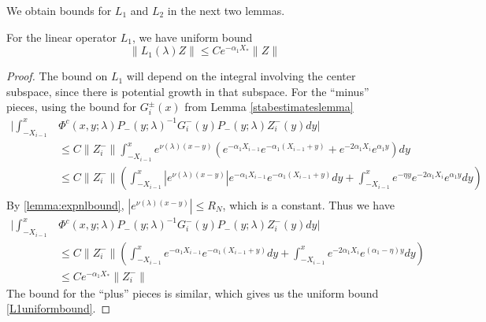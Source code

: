 \documentclass[thesis.tex]{subfiles}
\begin{document}
We obtain bounds for $L_1$ and $L_2$ in the next two lemmas.

\begin{lemma}\label{L1boundlemma}
For the linear operator $L_1$, we have uniform bound
\begin{equation}\label{L1uniformbound}
\|L_1(\lambda)Z\| \leq C e^{-\alpha_1 X_*}\|Z\|
\end{equation}
\begin{proof}
The bound on $L_1$ will depend on the integral involving the center subspace, since there is potential growth in that subspace. For the ``minus'' pieces, using the bound for $G_i^\pm(x)$ from Lemma \ref{stabestimateslemma}
\begin{align*}
\Bigg| \int_{-X_{i-1}}^x &\Phi^c(x, y; \lambda) P_-(y; \lambda)^{-1} G_i^-(y) P_-(y; \lambda) Z_i^-(y) dy \Bigg| \\ 
&\leq C \| Z_i^-\|\int_{-X_{i-1}}^x e^{\nu(\lambda)(x - y)} \left( e^{-\alpha_1 X_{i-1}} e^{-\alpha_1(X_{i-1} + y) } + e^{-2 \alpha_1 X_i} e^{\alpha_1 y} \right) dy \\
&\leq C \| Z_i^-\|\left( \int_{-X_{i-1}}^x \left|e^{\nu(\lambda)(x - y)}\right| e^{-\alpha_1 X_{i-1}} e^{-\alpha_1(X_{i-1} + y) } dy + \int_{-X_{i-1}}^x e^{-\eta y} e^{-2\alpha_1 X_i} e^{\alpha_1 y} dy \right) \\
\end{align*}
By \cref{lemma:expnlbound}, $\left|e^{\nu(\lambda)(x - y)}\right| \leq R_N$, which is a constant. Thus we have
\begin{align*}
\Bigg| \int_{-X_{i-1}}^x &\Phi^c(x, y; \lambda) P_-(y; \lambda)^{-1} G_i^-(y) P_-(y; \lambda) Z_i^-(y) dy \Bigg| \\ 
&\leq C \| Z_i^-\|\left( \int_{-X_{i-1}}^x e^{-\alpha_1 X_{i-1}} e^{-\alpha_1(X_{i-1} + y) } dy + \int_{-X_{i-1}}^x e^{-2\alpha_1 X_i} e^{(\alpha_1 - \eta) y} dy \right) \\
&\leq C e^{-\alpha_1 X_*} \| Z_i^-\| 
\end{align*}
The bound for the ``plus'' pieces is similar, which gives us the uniform bound \cref{L1uniformbound}.
\end{proof}
\end{lemma}
\end{document}
